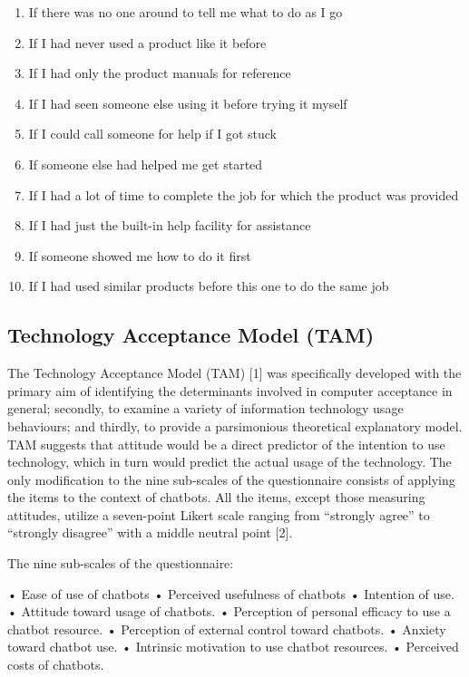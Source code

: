\documentclass[a4paper, nobind]{templates/ociamthesis}
\providecommand{\tightlist}{%
  \setlength{\itemsep}{0pt}\setlength{\parskip}{0pt}}
\begin{document}
\begin{enumerate}
\def\labelenumi{\arabic{enumi}.}
\tightlist
\item
  If there was no one around to tell me what to do as I go
\item
  If I had never used a product like it before
\item
  If I had only the product manuals for reference
\item
  If I had seen someone else using it before trying it myself
\item
  If I could call someone for help if I got stuck
\item
  If someone else had helped me get started
\item
  If I had a lot of time to complete the job for which the product was provided
\item
  If I had just the built-in help facility for assistance
\item
  If someone showed me how to do it first
\item
  If I had used similar products before this one to do the same job
\end{enumerate}

\hypertarget{technology-acceptance-model-tam}{%
\subsection{Technology Acceptance Model (TAM)}\label{technology-acceptance-model-tam}}

The Technology Acceptance Model (TAM) {[}1{]} was specifically developed with the primary aim of identifying the determinants involved in computer acceptance in general; secondly, to examine a variety of information technology usage behaviours; and thirdly, to provide a parsimonious theoretical explanatory model.
TAM suggests that attitude would be a direct predictor of the intention to use technology, which in turn would predict the actual usage of the technology.
The only modification to the nine sub-scales of the questionnaire consists of applying the items to the context of chatbots.
All the items, except those measuring attitudes, utilize a seven-point Likert scale ranging from ``strongly agree'' to ``strongly disagree'' with a middle neutral point {[}2{]}.

The nine sub-scales of the questionnaire:

• Ease of use of chatbots • Perceived usefulness of chatbots • Intention of use.
• Attitude toward usage of chatbots.
• Perception of personal efficacy to use a chatbot resource.
• Perception of external control toward chatbots.
• Anxiety toward chatbot use.
• Intrinsic motivation to use chatbot resources.
• Perceived costs of chatbots.
\end{document}
